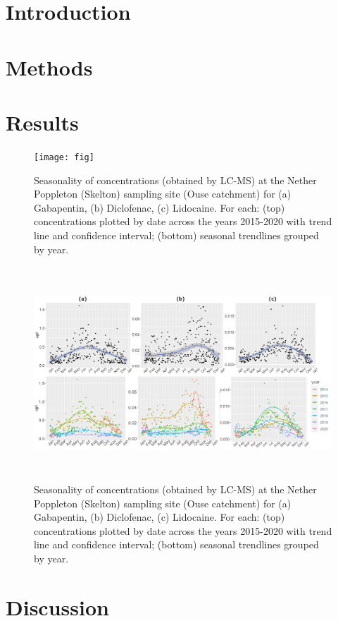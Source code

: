 \documentclass{article}
\begin{document}
\clearpage

\section{Introduction}

\clearpage
\section{Methods}

\clearpage
\section{Results}
\begin{figure}[!hb]
    \centering
    \texttt{[image: fig]}
    \caption{Seasonality of concentrations (obtained by LC-MS) at the Nether Poppleton (Skelton) sampling site (Ouse catchment) for (a) Gabapentin, (b) Diclofenac, (c) Lidocaine. For each: (top) concentrations plotted by date across the years 2015-2020 with trend line and confidence interval; (bottom) seasonal trendlines grouped by year.}
    \label{fig_ouse_site_seasonality}
\end{figure}

\begin{figure}[!hb]
    \centering
    \includegraphics[height=8cm]{fig_seasonality.png}
    \caption{Seasonality of concentrations (obtained by LC-MS) at the Nether Poppleton (Skelton) sampling site (Ouse catchment) for (a) Gabapentin, (b) Diclofenac, (c) Lidocaine. For each: (top) concentrations plotted by date across the years 2015-2020 with trend line and confidence interval; (bottom) seasonal trendlines grouped by year.}
    \label{fig_ouse_site_seasonality}
\end{figure}



\clearpage
\section{Discussion}

\clearpage
%



\end{document}

